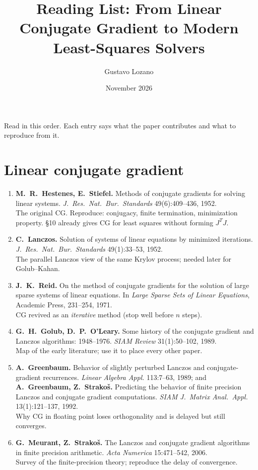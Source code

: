 \documentclass[11pt,a4paper]{article}
\title{Reading List: From Linear Conjugate Gradient to Modern Least-Squares Solvers}
\author{Gustavo Lozano}
\date{November 2026}
\begin{document}
\maketitle

\noindent Read in this order. Each entry says what the paper contributes and what to reproduce from it.

\section{Linear conjugate gradient}
\begin{enumerate}
\item \textbf{M.~R.~Hestenes, E.~Stiefel.} Methods of conjugate gradients for solving linear systems. \emph{J.\ Res.\ Nat.\ Bur.\ Standards} 49(6):409--436, 1952.\\
The original CG. Reproduce: conjugacy, finite termination, minimization property. §10 already gives CG for least squares without forming $J^TJ$.

\item \textbf{C.~Lanczos.} Solution of systems of linear equations by minimized iterations. \emph{J.\ Res.\ Nat.\ Bur.\ Standards} 49(1):33--53, 1952.\\
The parallel Lanczos view of the same Krylov process; needed later for Golub--Kahan.

\item \textbf{J.~K.~Reid.} On the method of conjugate gradients for the solution of large sparse systems of linear equations. In \emph{Large Sparse Sets of Linear Equations}, Academic Press, 231--254, 1971.\\
CG revived as an \emph{iterative} method (stop well before $n$ steps).

\item \textbf{G.~H.~Golub, D.~P.~O'Leary.} Some history of the conjugate gradient and Lanczos algorithms: 1948--1976. \emph{SIAM Review} 31(1):50--102, 1989.\\
Map of the early literature; use it to place every other paper.

\item \textbf{A.~Greenbaum.} Behavior of slightly perturbed Lanczos and conjugate-gradient recurrences. \emph{Linear Algebra Appl.} 113:7--63, 1989; and \textbf{A.~Greenbaum, Z.~Strakoš.} Predicting the behavior of finite precision Lanczos and conjugate gradient computations. \emph{SIAM J.\ Matrix Anal.\ Appl.} 13(1):121--137, 1992.\\
Why CG in floating point loses orthogonality and is delayed but still converges.

\item \textbf{G.~Meurant, Z.~Strakoš.} The Lanczos and conjugate gradient algorithms in finite precision arithmetic. \emph{Acta Numerica} 15:471--542, 2006.\\
Survey of the finite-precision theory; reproduce the delay of convergence.
\end{enumerate}
\end{document}
